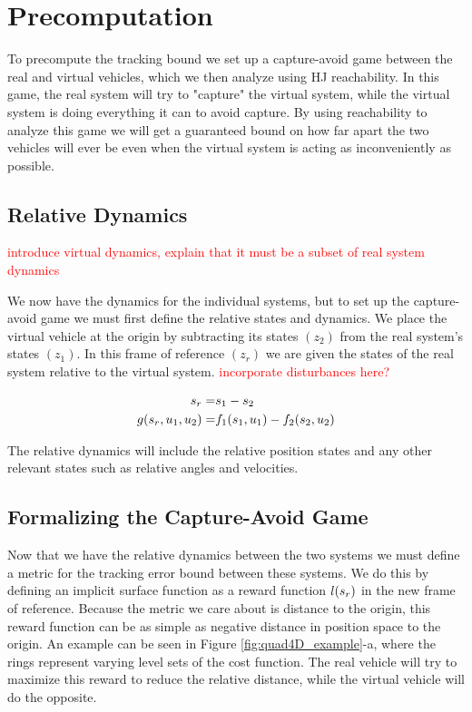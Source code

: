 \section{Precomputation \label{sec:precomp}}

To precompute the tracking bound we set up a capture-avoid game between the real and virtual vehicles, which we then analyze using HJ reachability. In this game, the real system will try to "capture" the virtual system, while the virtual system is doing everything it can to avoid capture. By using reachability to analyze this game we will get a guaranteed bound on how far apart the two vehicles will ever be even when the virtual system is acting as inconveniently as possible.

\subsection{Relative Dynamics}
\textcolor{red}{introduce virtual dynamics, explain that it must be a subset of real system dynamics}

We now have the dynamics for the individual systems, but to set up the capture-avoid game we must first define the relative states and dynamics. We place the virtual vehicle at the origin by subtracting its states $(z_2)$ from the real system's states $(z_1)$. In this frame of reference $(z_r)$ we are given the states of the real system relative to the virtual system. \textcolor{red}{incorporate disturbances here?}

\begin{equation}
\begin{aligned}
s_r =& s_1 - s_2 \\
g(s_r,u_1,u_2) =& f_1(s_1,u_1) - f_2(s_2,u_2)
\end{aligned}
\end{equation}

The relative dynamics will include the relative position states and any other relevant states such as relative angles and velocities.

\subsection{Formalizing the Capture-Avoid Game}
Now that we have the relative dynamics between the two systems we must define a metric for the tracking error bound between these systems. We do this by defining an implicit surface function as a reward function $l(s_r)$ in the new frame of reference. Because the metric we care about is distance to the origin, this reward function can be as simple as negative distance in position space to the origin. An example can be seen in Figure \ref{fig:quad4D_example}-a, where the rings represent varying level sets of the cost function. The real vehicle will try to maximize this reward to reduce the relative distance, while the virtual vehicle will do the opposite.

